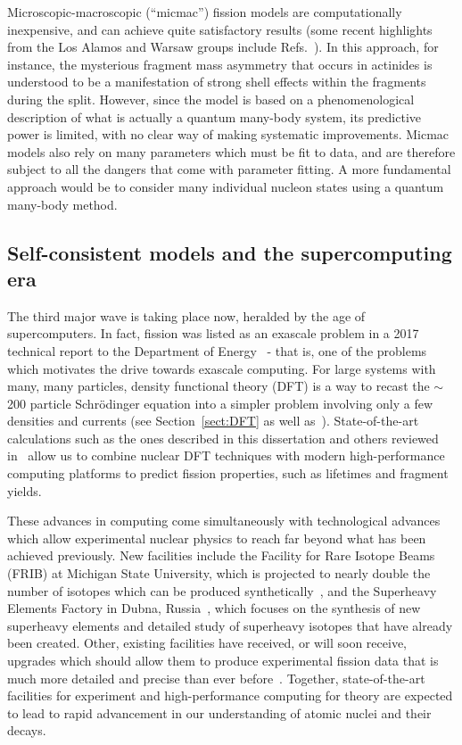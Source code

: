 Microscopic-macroscopic (``micmac'') fission models are computationally inexpensive, and can achieve quite satisfactory results (some recent highlights from the Los Alamos and Warsaw groups include Refs.~\cite{Moller2015a,Moller2015b,Jachimowicz2013,Jachimowicz2017}). In this approach, for instance, the mysterious fragment mass asymmetry that occurs in actinides is understood to be a manifestation of strong shell effects within the fragments during the split. However, since the model is based on a phenomenological description of what is actually a quantum many-body system, its predictive power is limited, with no clear way of making systematic improvements. Micmac models also rely on many parameters which must be fit to data, and are therefore subject to all the dangers that come with parameter fitting. A more fundamental approach would be to consider many individual nucleon states using a quantum many-body method. 

\subsection{Self-consistent models and the supercomputing era}
The third major wave is taking place now, heralded by the age of supercomputers. In fact, fission was listed as an exascale problem in a 2017 technical report to the Department of Energy~\cite{Carlson2017} - that is, one of the problems which motivates the drive towards exascale computing. For large systems with many, many particles, density functional theory (DFT) is a way to recast the ${\sim}$200 particle Schr\"{o}dinger equation into a simpler problem involving only a few densities and currents (see Section~\ref{sect:DFT} as well as~\cite{bender2003}). State-of-the-art calculations such as the ones described in this dissertation and others reviewed in~\cite{schunck2016} allow us to combine nuclear DFT techniques with modern high-performance computing platforms to predict fission properties, such as lifetimes and fragment yields.%

These advances in computing come simultaneously with technological advances which allow experimental nuclear physics to reach far beyond what has been achieved previously. New facilities include the Facility for Rare Isotope Beams (FRIB) at Michigan State University, which is projected to nearly double the number of isotopes which can be produced synthetically~\cite{Baumann2016}, and the Superheavy Elements Factory in Dubna, Russia~\cite{dmitriev2016}, which focuses on the synthesis of new superheavy elements and detailed study of superheavy isotopes that have already been created. Other, existing facilities have received, or will soon receive, upgrades which should allow them to produce experimental fission data that is much more detailed and precise than ever before~\cite{andreyev2018}. Together, state-of-the-art facilities for experiment and high-performance computing for theory are expected to lead to rapid advancement in our understanding of atomic nuclei and their decays.

